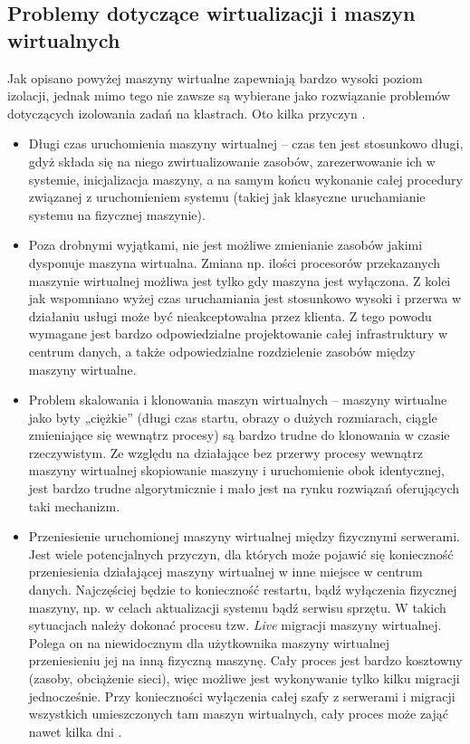 \documentclass[10pt,a4paper,titlepage,twoside]{report}
\begin{document}
\subsection{Problemy dotyczące wirtualizacji i maszyn wirtualnych}\indent \indent Jak opisano powyżej maszyny wirtualne zapewniają bardzo wysoki poziom izolacji, jednak mimo tego nie zawsze są wybierane jako rozwiązanie problemów dotyczących izolowania zadań na klastrach. Oto kilka przyczyn \cite{ad19}\cite{ad20}.
\begin{itemize}
	\item Długi czas uruchomienia maszyny wirtualnej – czas ten jest stosunkowo długi, gdyż składa się na niego zwirtualizowanie zasobów, zarezerwowanie ich w systemie, inicjalizacja maszyny, a na samym końcu wykonanie całej procedury związanej z uruchomieniem systemu (takiej jak klasyczne uruchamianie systemu na fizycznej maszynie).
	\item Poza drobnymi wyjątkami, nie jest możliwe zmienianie zasobów jakimi dysponuje maszyna wirtualna. Zmiana np. ilości procesorów przekazanych maszynie wirtualnej możliwa jest tylko gdy maszyna jest wyłączona. Z kolei jak wspomniano wyżej czas uruchamiania jest stosunkowo wysoki i przerwa w działaniu usługi może być nieakceptowalna przez klienta. Z tego powodu wymagane jest bardzo odpowiedzialne projektowanie całej infrastruktury w centrum danych, a także odpowiedzialne rozdzielenie zasobów między maszyny wirtualne.
	\item Problem skalowania i klonowania maszyn wirtualnych – maszyny wirtualne jako byty „ciężkie” (długi czas startu, obrazy o dużych rozmiarach, ciągle zmieniające się wewnątrz procesy) są bardzo trudne do klonowania w czasie rzeczywistym. Ze względu na działające bez przerwy procesy wewnątrz maszyny wirtualnej skopiowanie maszyny i uruchomienie obok identycznej, jest bardzo trudne algorytmicznie i mało jest na rynku rozwiązań oferujących taki mechanizm.
	\item Przeniesienie uruchomionej maszyny wirtualnej między fizycznymi serwerami. Jest wiele potencjalnych przyczyn, dla których może pojawić się konieczność przeniesienia działającej maszyny wirtualnej w inne miejsce w centrum danych. Najczęściej będzie to konieczność restartu, bądź wyłączenia fizycznej maszyny, np. w celach aktualizacji systemu bądź serwisu sprzętu. W takich sytuacjach należy dokonać procesu tzw. \textit{Live} migracji maszyny wirtualnej. Polega on na niewidocznym dla użytkownika maszyny wirtualnej przeniesieniu jej na inną fizyczną maszynę. Cały proces jest bardzo kosztowny (zasoby, obciążenie sieci), więc możliwe jest wykonywanie tylko kilku migracji jednocześnie. Przy konieczności wyłączenia całej szafy z serwerami i migracji wszystkich umieszczonych tam maszyn wirtualnych, cały proces może zająć nawet kilka dni \cite{ad15}.
\end{itemize}
\end{document}
